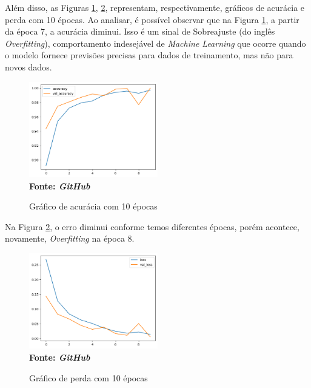 Além disso, as Figuras \ref{fig:acc10}, \ref{fig:loss10}, representam, respectivamente, gráficos de acurácia e perda com 10 épocas. Ao analisar, é possível observar que na Figura \ref{fig:acc10}, a partir da época 7, a acurácia diminui. Isso é um sinal de Sobreajuste (do inglês \textit{Overfitting}), comportamento indesejável de \textit{Machine Learning} que ocorre quando o modelo fornece previsões precisas para dados de treinamento, mas não para novos dados.

\begin{figure}[ht]
 	\centering	
 	\caption[\hspace{0.1cm}Grade Computacional.]{Gráfico de acurácia com 10 épocas}
 	\vspace{-0.4cm}
 	\includegraphics[width=0.5\textwidth]{figuras/accuracy_10.png}
 	\captionsetup{justification=centering}
	\vspace{-0.2cm}
     \\\textbf{\footnotesize Fonte: \textit{GitHub}}
	\label{fig:acc10}
\end{figure}

Na Figura \ref{fig:loss10}, o erro diminui conforme temos diferentes épocas, porém acontece, novamente, \textit{Overfitting} na época 8. 

\begin{figure}[ht]
 	\centering	
 	\caption[\hspace{0.1cm}Grade Computacional.]{Gráfico de perda com 10 épocas}
 	\vspace{-0.4cm}
 	\includegraphics[width=0.5\textwidth]{figuras/loss_10.png}
 	\captionsetup{justification=centering}
	\vspace{-0.2cm}
     \\\textbf{\footnotesize Fonte: \textit{GitHub}}
	\label{fig:loss10}
\end{figure}

